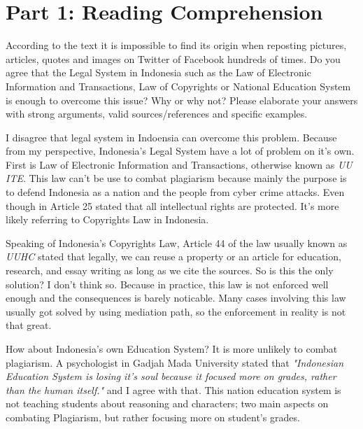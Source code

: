\documentclass[
  12pt,
  answers  
]{exam}
\begin{document}
        \section{Part 1: Reading Comprehension}
    \begin{questions}
        \question
        According to the text  it is impossible to find its origin when reposting pictures,
        articles, quotes and images on Twitter of Facebook hundreds of times. Do you agree that the Legal System in Indonesia such as the Law of Electronic Information and Transactions, Law of Copyrights or National Education System is enough to overcome this issue? Why or why not? Please elaborate your answers with strong arguments, valid sources/references and specific examples.

    \begin{solution}
        I disagree that legal system in Indoensia can overcome this problem. Because from my perspective, Indonesia's Legal System have a lot of problem on it's own. First is Law of Electronic Information and Transactions, otherwise known as \emph{UU ITE}. This law can't be use to combat plagiarism because mainly the purpose is to defend Indonesia as a nation and the people from cyber crime attacks. Even though in Article 25 stated that all intellectual rights are protected. \cite{pemerintahindonesiaUndangUndangNomor112008} It's more likely referring to Copyrights Law in Indonesia. \cite{kurniaPelanggaranHakCipta}  

        Speaking of Indonesia's Copyrights Law, Article 44 of the law usually known as \emph{UUHC} stated that legally, we can reuse a property or an article for education, research, and essay writing as long as we cite the sources.\cite{pemerintahindonesiaUndangUndangNomor282014} So is this the only solution? I don't think so. Because in practice, this law is not enforced well enough and the consequences is barely noticable. Many cases involving this law usually got solved by using mediation path, so the enforcement in reality is not that great.

        How about Indonesia's own Education System? It is more unlikely to combat plagiarism. A psychologist in Gadjah Mada University stated that \emph{"Indonesian Education System is losing it's soul because it focused more on grades, rather than the human itself."} \cite{PendidikanDiIndonesia2019} and I agree with that. This nation education system is not teaching students about reasoning and characters; two main aspects on combating Plagiarism, but rather focusing more on student's grades. 


\end{solution}
\end{questions}
\end{document}
